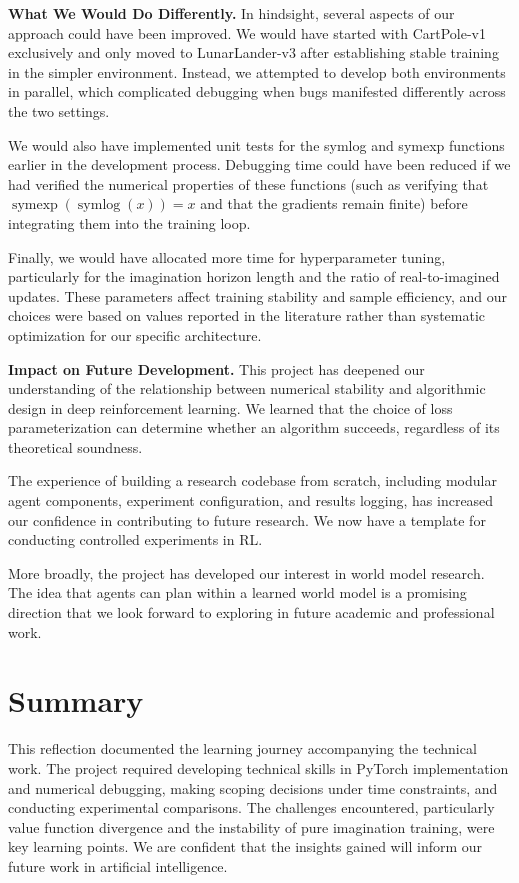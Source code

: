 \bigskip

\noindent\textbf{What We Would Do Differently.}
In hindsight, several aspects of our approach could have been improved. We would have started with CartPole-v1 exclusively and only moved to LunarLander-v3 after establishing stable training in the simpler environment. Instead, we attempted to develop both environments in parallel, which complicated debugging when bugs manifested differently across the two settings.

We would also have implemented unit tests for the symlog and symexp functions earlier in the development process. Debugging time could have been reduced if we had verified the numerical properties of these functions (such as verifying that $\operatorname{symexp}(\operatorname{symlog}(x)) = x$ and that the gradients remain finite) before integrating them into the training loop.

Finally, we would have allocated more time for hyperparameter tuning, particularly for the imagination horizon length and the ratio of real-to-imagined updates. These parameters affect training stability and sample efficiency, and our choices were based on values reported in the literature rather than systematic optimization for our specific architecture.

\bigskip

\noindent\textbf{Impact on Future Development.}
This project has deepened our understanding of the relationship between numerical stability and algorithmic design in deep reinforcement learning. We learned that the choice of loss parameterization can determine whether an algorithm succeeds, regardless of its theoretical soundness.

The experience of building a research codebase from scratch, including modular agent components, experiment configuration, and results logging, has increased our confidence in contributing to future research. We now have a template for conducting controlled experiments in RL.

More broadly, the project has developed our interest in world model research. The idea that agents can plan within a learned world model is a promising direction that we look forward to exploring in future academic and professional work.

\section{Summary}

This reflection documented the learning journey accompanying the technical work. The project required developing technical skills in PyTorch implementation and numerical debugging, making scoping decisions under time constraints, and conducting experimental comparisons. The challenges encountered, particularly value function divergence and the instability of pure imagination training, were key learning points. We are confident that the insights gained will inform our future work in artificial intelligence.
